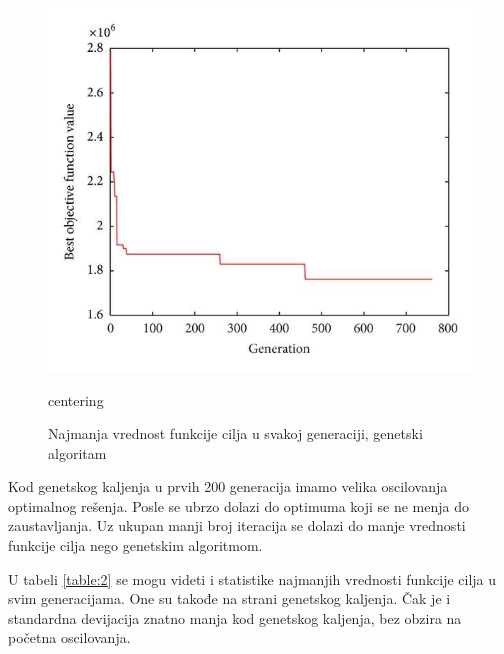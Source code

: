 \documentclass[a4paper]{article}
\begin{document}
\newpage
\begin{figure}[h!]
\centering
\includegraphics[scale= 0.4]{LIRP_Grafik_Genetski_Algoritam}
\caption{Najmanja vrednost funkcije cilja u svakoj generaciji, genetski algoritam}

\label{fig:4}centering
\end{figure}

Kod genetskog kaljenja u prvih 200 generacija imamo velika oscilovanja optimalnog rešenja. Posle se ubrzo dolazi do optimuma koji se ne menja do zaustavljanja. Uz ukupan manji broj iteracija se dolazi do manje vrednosti funkcije cilja nego genetskim algoritmom.

U tabeli \ref{table:2} se mogu videti i statistike najmanjih vrednosti funkcije cilja u svim generacijama. One su takođe na strani genetskog kaljenja. Čak je i standardna devijacija znatno manja kod genetskog kaljenja, bez obzira na početna oscilovanja.

\begin{table}[ht]
\centering
{}
\label{table:2}
\caption{Statistike najmanjih vrednosti funkcije cilja u svim generacijama}
\end{table}
\end{document}
